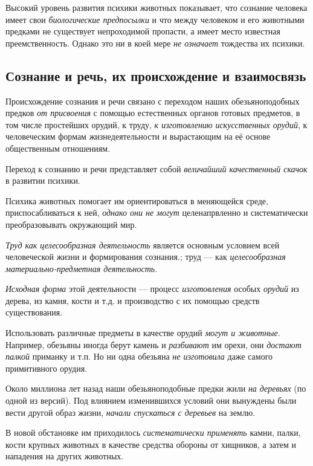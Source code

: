 \documentclass[a4paper,14pt,russian]{extreport}
\begin{document}
Высокий уровень развития психики животных показывает, что сознание человека имеет свои \emph{биологические предпосылки} и что между человеком и его животными предками не существует непроходимой пропасти, а имеет место известная преемственность. Однако это ни в коей мере \emph{не означает} тождества их психики.

\subsection{Сознание и речь, их происхождение и взаимосвязь}

Происхождение сознания и речи связано с переходом наших обезьяноподобных предков \emph{от присвоения} с помощью естественных органов готовых предметов, в том числе простейших орудий, к труду, \emph{к изготовлению} \emph{искусственных орудий}, к человеческим формам жизнедеятельности и вырастающим на её основе общественным отношениям.

Переход к сознанию и речи представляет собой \emph{величайший качественный скачок} в развитии психики.

Психика животных помогает им ориентироваться в меняющейся среде, приспосабливаться к ней, \emph{однако они не могут} целенапрвленно и систематически преобразовывать окружающий мир.

\emph{Труд как целесообразная деятельность} является основным условием всей человеческой жизни и формирования сознания.; труд --- как \emph{целесообразная материально-предметная деятельность}.

\emph{Исходная форма} этой деятельности --- процесс \emph{изготовления} особых \emph{орудий} из дерева, из камня, кости и т.д. и производство с их помощью средств существования.

Использовать различные предметы в качестве орудий \emph{могут и животные}. Например, обезьяны иногда берут камень и \emph{разбивают} им орехи, они \emph{достают палкой} приманку и т.п. Но ни одна обезьяна \emph{не изготовила} даже самого примитивного орудия.

Около миллиона лет назад наши обезьяноподобные предки жили \emph{на деревьях} (по одной из версий). Под влиянием изменившихся условий они вынуждены были вести другой образ жизни, \emph{начали спускаться с деревьев} на землю.

В новой обстановке им приходилось \emph{систематически применять} камни, палки, кости крупных животных в качестве средства обороны от хищников, а затем и нападения на других животных.
\end{document}
